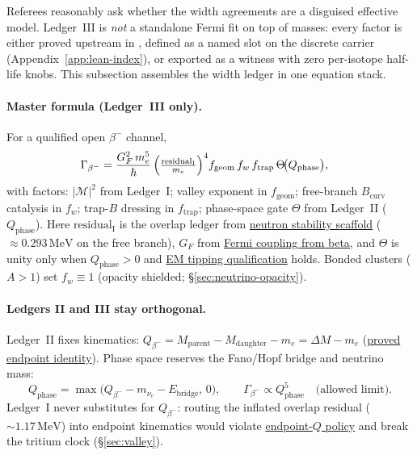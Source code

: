 \documentclass[11pt,notitlepage]{amsart}
\begin{document}
Referees reasonably ask whether the width agreements are a disguised effective model.
Ledger~III is \emph{not} a standalone Fermi fit on top of masses: every factor is either
proved upstream in \cite{hqiv-tuft-sm-lagrangian-paper}, defined as a named slot on the
discrete carrier (Appendix~\ref{app:lean-index}), or exported as a witness with zero
per-isotope half-life knobs. This subsection assembles the width ledger in one equation
stack.

\paragraph{Master formula (Ledger~III only).}
For a qualified open $\beta^-$ channel,
\begin{equation}\label{eq:width-master}
\begin{aligned}
  \Gamma_{\beta^-}
    &= \frac{G_F^2\, m_e^5}{\hbar}\,
      \Bigl(\tfrac{\mathrm{residual}_{\mathrm{I}}}{m_e}\Bigr)^4
      f_{\mathrm{geom}}\, f_w\, f_{\mathrm{trap}}\,
      \Theta\!\bigl(Q_{\mathrm{phase}}\bigr),
\end{aligned}
\end{equation}
with factors: $|\mathcal{M}|^2$ from Ledger~I; valley exponent in $f_{\mathrm{geom}}$;
free-branch $B_{\mathrm{curv}}$ catalysis in $f_w$; trap-$B$ dressing in $f_{\mathrm{trap}}$;
phase-space gate $\Theta$ from Ledger~II ($Q_{\mathrm{phase}}$).
Here $\mathrm{residual}_{\mathrm{I}}$ is the overlap ledger from
\hyperref[lean:neutron-scaffold]{neutron stability scaffold}
($\approx 0.293\,\mathrm{MeV}$ on the free branch),
$G_F$ from \hyperref[lean:gf-from-beta]{Fermi coupling from beta},
and $\Theta$ is unity only when $Q_{\mathrm{phase}}>0$ and
\hyperref[lean:em-tipping]{EM tipping qualification} holds.
Bonded clusters ($A>1$) set $f_w\equiv 1$ (opacity shielded; \S\ref{sec:neutrino-opacity}).

\paragraph{Ledgers II and III stay orthogonal.}
Ledger~II fixes kinematics:
$Q_{\beta^-}=M_{\mathrm{parent}}-M_{\mathrm{daughter}}-m_e=\Delta M-m_e$
(\hyperref[lean:endpoint-q-theorem]{proved endpoint identity}).
Phase space reserves the Fano/Hopf bridge and neutrino mass:
\begin{equation}\label{eq:q-phase-stack}
  Q_{\mathrm{phase}}
    = \max\bigl(Q_{\beta^-} - m_{\nu_e} - E_{\mathrm{bridge}},\,0\bigr),
  \qquad
  \Gamma_{\beta^-}\propto Q_{\mathrm{phase}}^{5}
  \quad\text{(allowed limit)}.
\end{equation}
Ledger~I never substitutes for $Q_{\beta^-}$: routing the inflated overlap residual
($\sim 1.17\,\mathrm{MeV}$) into endpoint kinematics would violate
\hyperref[lean:endpoint-q-theorem]{endpoint-$Q$ policy} and break the tritium clock
(\S\ref{sec:valley}).
\end{document}
